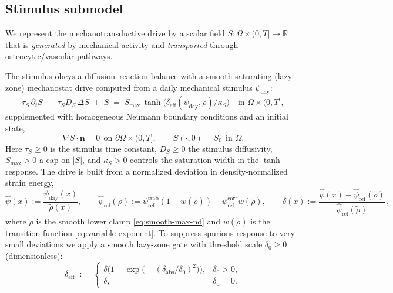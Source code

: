 \subsection*{Stimulus submodel}\label{subsec:stim-nd}
We represent the mechanotransductive drive by a scalar field $S:\Omega\times(0,T]\to\mathbb{R}$ that is \emph{generated} by mechanical activity and \emph{transported} through osteocytic/vascular pathways. 

The stimulus obeys a diffusion--reaction balance with a smooth saturating (lazy-zone) mechanostat drive computed from a daily mechanical stimulus $\psi_{\mathrm{day}}$:
\begin{equation}\label{eq:stim-strong-nd}
\tau_S\,\partial_t S \;-\; \tau_S D_S\,\Delta S \;+\; S
\;=\; S_{\max}\,\tanh\!\Big(\delta_{\mathrm{eff}}(\psi_{\mathrm{day}},\rho)/\kappa_S\Big)
\quad\text{in }\Omega\times(0,T],
\end{equation}
supplemented with homogeneous Neumann boundary conditions and an initial state,
\begin{equation}\label{eq:stim-bc-ic-nd}
\nabla S\!\cdot\!\mathbf{n}=0\ \ \text{on }\partial\Omega\times(0,T],\qquad
S(\cdot,0)=S_0\ \ \text{in }\Omega.
\end{equation}
Here $\tau_S\ge 0$ is the stimulus time constant, $D_S\ge 0$ the stimulus diffusivity, $S_{\max}>0$ a cap on $|S|$, and $\kappa_S>0$ controls the saturation width in the $\tanh$ response. The drive is built from a normalized deviation in density-normalized strain energy,
\[
\hat{\psi}(x):=\frac{\psi_{\mathrm{day}}(x)}{\widetilde\rho(x)},\qquad
\hat{\psi}_{\mathrm{ref}}(\widetilde{\rho}):=\psi_{\mathrm{ref}}^{\mathrm{trab}}(1-w(\widetilde{\rho})) + \psi_{\mathrm{ref}}^{\mathrm{cort}}w(\widetilde{\rho}),\qquad
\delta(x):=\frac{\hat{\psi}(x)-\hat{\psi}_{\mathrm{ref}}(\widetilde{\rho})}{\hat{\psi}_{\mathrm{ref}}(\widetilde{\rho})}\,,
\]
where $\widetilde\rho$ is the smooth lower clamp \eqref{eq:smooth-max-nd} and $w(\widetilde{\rho})$ is the transition function \eqref{eq:variable-exponent}. To suppress spurious response to very small deviations we apply a smooth lazy-zone gate with threshold scale $\delta_0\ge 0$ (dimensionless):
\[
\delta_{\mathrm{eff}} \;:=\;
\begin{cases}
\delta\Big(1-\exp\!\big(-(\delta_{\mathrm{abs}}/\delta_0)^2\big)\Big), & \delta_0>0,\\
\delta, & \delta_0=0.
\end{cases}
\]
